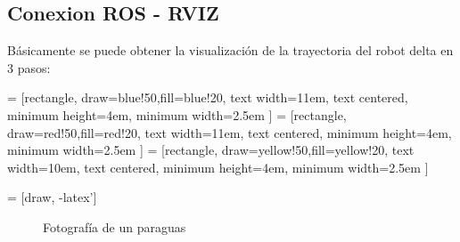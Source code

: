    \subsection{Conexion ROS - RVIZ}
   
           Básicamente se puede obtener la visualización de la trayectoria del robot delta en 3 pasos:


         = [rectangle, draw=blue!50,fill=blue!20, text width=11em, text centered, minimum height=4em, minimum width=2.5em ]
         = [rectangle, draw=red!50,fill=red!20, text width=11em, text centered, minimum height=4em, minimum width=2.5em ]
         = [rectangle, draw=yellow!50,fill=yellow!20, text width=10em, text centered, minimum height=4em, minimum width=2.5em ]
        
         = [draw, -latex']
         \begin{center}
         \begin{figure}[htb]
                \caption{Fotografía de un paraguas}
                \label{f:cap6_trayectory_1}
         \end{figure}
         \end{center}
         
        \vspace{-1cm}   
        
